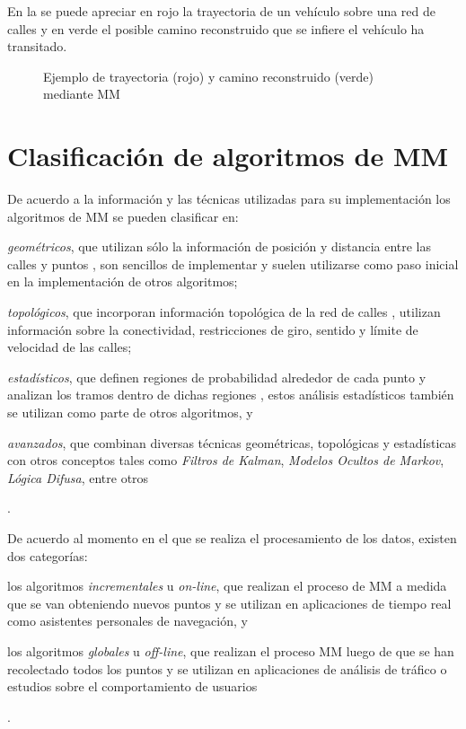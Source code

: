 En la  se puede apreciar en rojo la trayectoria de un vehículo sobre una red de calles y en verde el posible camino reconstruido que se infiere el vehículo ha transitado.

\begin{figure}[h]
	\centering
	
	\caption[Trayectoria y camino reconstruido mediante MM]{Ejemplo de trayectoria (rojo) y camino reconstruido (verde) mediante MM}
	\label{fig:map-matching} 
\end{figure}

\section{Clasificación de algoritmos de MM}

De acuerdo a la información y las técnicas utilizadas para su implementación los algoritmos de MM se pueden clasificar en: \begin{enumerate*}[1)]\item \emph{geométricos}, que utilizan sólo la información de posición y distancia entre las calles y puntos \cite{white2000some}, son sencillos de implementar y suelen utilizarse como paso inicial en la implementación de otros algoritmos; \item \emph{topológicos}, que incorporan información topológica de la red de calles \cite{lou2009map,yuan2010interactive,greenfeld2002matching,quddus2003general}, utilizan información sobre la conectividad, restricciones de giro, sentido y límite de velocidad de las calles; \item \emph{estadísticos}, que definen regiones de probabilidad alrededor de cada punto y analizan los tramos dentro de dichas regiones \cite{ochieng2009map}, estos análisis estadísticos también se utilizan como parte de otros algoritmos, y \item \emph{avanzados}, que combinan diversas técnicas geométricas, topológicas y estadísticas con otros conceptos tales como \emph{Filtros de Kalman}, \emph{Modelos Ocultos de Markov}, \emph{Lógica Difusa}, entre otros \cite{thiagarajan2009vtrack,quddus2006high,thiagarajan2011accurate,fang2011enacq}\end{enumerate*}.

De acuerdo al momento en el que se realiza el procesamiento de los datos, existen dos categorías: \begin{enumerate*}[1)] \item los algoritmos \emph{incrementales} u \emph{on-line}, que realizan el proceso de MM a medida que se van obteniendo nuevos puntos \cite{thiagarajan2009vtrack,thiagarajan2011accurate,greenfeld2002matching,quddus2003general,quddus2006high} y se utilizan en aplicaciones de tiempo real como asistentes personales de navegación, y \item los algoritmos \emph{globales} u \emph{off-line}, que realizan el proceso MM luego de que se han recolectado todos los puntos \cite{lou2009map,yuan2010interactive} y se utilizan en aplicaciones de análisis de tráfico o estudios sobre el comportamiento de usuarios\end{enumerate*}.


